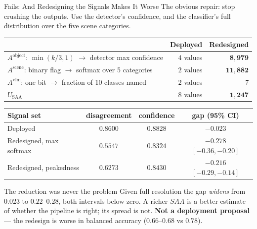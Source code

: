 \documentclass[aspectratio=169,11pt]{beamer}
\begin{document}
\begin{frame}{Fails: And Redesigning the Signals Makes It Worse}
\scriptsize
The obvious repair: stop crushing the outputs. Use the detector's confidence, and the classifier's full distribution over the five scene categories.
\vspace{1mm}
\begin{center}\scriptsize
\begin{tabular}{@{}l r r@{}}
\toprule
& \textbf{Deployed} & \textbf{Redesigned} \\
\midrule
$A^{\text{object}}$: $\min(k/3,1)$ $\rightarrow$ detector max confidence & $4$ values & $\mathbf{8{,}979}$ \\
$A^{\text{scene}}$: binary flag $\rightarrow$ softmax over 5 categories & $2$ values & $\mathbf{11{,}882}$ \\
$A^{\text{vlm}}$: one bit $\rightarrow$ fraction of 10 classes named & $2$ values & $7$ \\
$U_{\text{SAA}}$ & $8$ values & $\mathbf{1{,}247}$ \\
\bottomrule
\end{tabular}
\end{center}
\vspace{-1mm}
\begin{center}\scriptsize
\begin{tabular}{@{}l c c c@{}}
\toprule
\textbf{Signal set} & \textbf{disagreement} & \textbf{confidence} & \textbf{gap (95\% CI)} \\
\midrule
Deployed & $0.8600$ & $0.8828$ & $-0.023$ \\
Redesigned, max softmax & $0.5547$ & $\mathbf{0.8324}$ & $\mathbf{-0.278}$ $[-0.36,-0.20]$ \\
Redesigned, peakedness & $0.6273$ & $\mathbf{0.8430}$ & $\mathbf{-0.216}$ $[-0.29,-0.14]$ \\
\bottomrule
\end{tabular}
\end{center}
\vspace{-2mm}
\begin{alertblock}{\scriptsize The reduction was never the problem}
\scriptsize Given full resolution the gap \emph{widens} from $0.023$ to $0.22$--$0.28$, both intervals below zero. A richer $SAA$ is a better estimate of whether the pipeline is right; its spread is not. \textbf{Not a deployment proposal} --- the redesign is worse in balanced accuracy ($0.66$--$0.68$ vs $0.78$).
\end{alertblock}
\end{frame}
\end{document}
